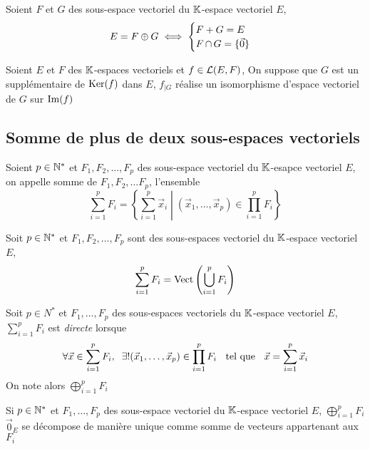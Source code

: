 \begin{prp}
Soient $F$ et $G$ des sous-espace vectoriel du $\mathbb{K}$-espace vectoriel
$E$,
\[
    E = F \oplus G \iff
    \begin{cases}
        F + G = E \\
        F \operatorname{\cap} G = \{\vec{0}\}
    \end{cases}
\]
\end{prp}

\begin{prp}
Soient $E$ et $F$ des $\mathbb{K}$-espaces vectoriels et $f \in \operatorname{\mathcal{L}}(E, F)$,
On suppose que $G$ est un supplémentaire de $\operatorname{Ker}(f)$ dans $E$,
$f_{|G}$ réalise un isomorphisme d'espace vectoriel de $G$ sur $\operatorname{Im}(f)$
\end{prp}


\subsection{Somme de plus de deux sous-espaces vectoriels}

\begin{dfn}
Soient $p \in \mathbb{N}^*$ et $F_1, F_2, \ldots, F_p$ des sous-espace vectoriel
du $\mathbb{K}$-esapce vectoriel $E$, on appelle somme de $F_1, F_2, \ldots F_p$,
l'ensemble
\[
    \sum^p_{i = 1} F_i = \left\{ \sum^p_{i = 1} \vec{x}_i \middle|
    (\vec{x}_1, \ldots, \vec{x}_p) \in \prod^p_{i = 1} F_i \right\}
\]
\end{dfn}

\begin{prp}
Soit $p \in \mathbb{N}^*$ et $F_1, F_2, \ldots, F_p$ sont des
sous-espaces vectoriel du $\mathbb{K}$-espace vectoriel $E$,
\[
    \sum^p_{i = 1} F_i = \operatorname{Vect}\left( \bigcup^p_{i = 1} F_i \right)
\]
\end{prp}

\begin{dfn}
Soit $p \in N^*$ et $F_1, \ldots, F_p$ des sous-espaces vectoriels
du $\mathbb{K}$-espace vectoriel $E$, $\sum^p_{i = 1} F_i$ est \emph{directe}
lorsque
\[
    \forall \vec{x} \in \sum^p_{i = 1} F_i, \;\;
    \exists! (\vec{x}_1, \ldots, \vec{x}_p) \in \prod^p_{i = 1} F_i
    \;\;\text{ tel que }\;\; \vec{x} = \sum^p_{i = 1} \vec{x}_i
\]
On note alors $\bigoplus^p_{i = 1} F_i$
\end{dfn}

\begin{prp}
Si $p \in \mathbb{N}^*$ et $F_1, \ldots, F_p$ des sous-espace vectoriel du
$\mathbb{K}$-espace vectoriel $E$, $\bigoplus^p_{i = 1} F_i$ \ssi
$\vec{0}_E$ se décompose de manière unique comme somme de vecteurs
appartenant aux $F_i$
\end{prp}

